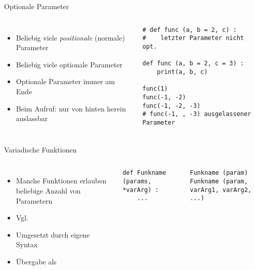 \begin{frame}[fragile]{Optionale Parameter}
%
\begin{columns}[T]
\begin{itemize}
\item Beliebig viele \emph{positionale} (normale) Parameter
\item Beliebig viele optionale Parameter
\item Optionale Parameter immer am Ende
\item Beim Aufruf: nur von hinten herein auslassbar
\end{itemize}
%
\begin{codebox}
\begin{verbatim}
# def func (a, b = 2, c) :
#    letzter Parameter nicht opt.

def func (a, b = 2, c = 3) :
    print(a, b, c)
    
func(1)
func(-1, -2)
func(-1, -2, -3)
# func(-1, , -3) ausgelassener Parameter
\end{verbatim}
\end{codebox}
\end{columns}
%
\end{frame}


\begin{frame}[fragile]{Variadische Funktionen}
%
\begin{columns}[T]
\begin{itemize}
\item Manche Funktionen erlauben beliebige Anzahl von Parametern
\item Vgl. 
\item Umgesetzt durch eigene Syntax
\item Übergabe als 
\end{itemize}
%
\begin{codebox}
\begin{verbatim}
def Funkname (params, *varArg) :
    ...
\end{verbatim}
\end{codebox}
%
\begin{codebox}
\begin{verbatim}
Funkname (param)
Funkname (param, varArg1, varArg2, ...)
\end{verbatim}
\end{codebox}
\end{columns}
%
\end{frame}

